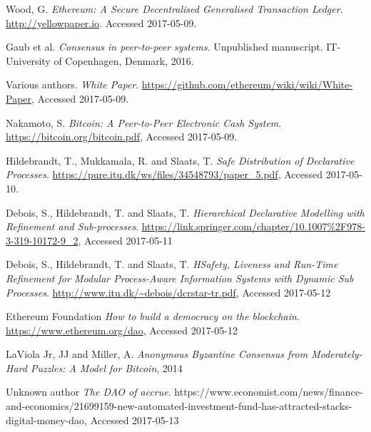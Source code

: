 \documentclass{article}
\begin{document}
	\pagebreak
	
	\begin{thebibliography}{99}

		Wood, G.
		\textit{Ethereum: A Secure Decentralised Generalised Transaction Ledger}. 
		\url{http://yellowpaper.io}.
		Accessed 2017-05-09.

		Gaub et al.
		\textit{Consensus in peer-to-peer systems}.
		Unpublished manuscript.
		IT-University of Copenhagen,
		Denmark,
		2016.

		Various authors.
		\textit{White Paper}.
		\url{https://github.com/ethereum/wiki/wiki/White-Paper},
		Accessed 2017-05-09.

		Nakamoto, S.
		\textit{Bitcoin: A Peer-to-Peer Electronic Cash System}.
		\url{https://bitcoin.org/bitcoin.pdf},
		Accessed 2017-05-09.

		Hildebrandt, T., Mukkamala, R. and Slaats, T.
		\textit{Safe Distribution of Declarative Processes}.
		\url{https://pure.itu.dk/ws/files/34548793/paper_5.pdf},
		Accessed 2017-05-10.

		Debois, S., Hildebrandt, T. and Slaats, T.
		\textit{Hierarchical Declarative Modelling with Refinement and Sub-processes}.
		\url{https://link.springer.com/chapter/10.1007%2F978-3-319-10172-9_2},
		Accessed 2017-05-11

		Debois, S., Hildebrandt, T. and Slaats, T.
		\textit{HSafety, Liveness and Run-Time Refinement for Modular Process-Aware Information Systems with Dynamic Sub Processes}.
		\url{http://www.itu.dk/~debois/dcrstar-tr.pdf},
		Accessed 2017-05-12
		
		Ethereum Foundation
		\textit{How to build a democracy on the blockchain}.
		\url{https://www.ethereum.org/dao},
		Accessed 2017-05-12

		LaViola Jr, JJ and Miller, A.
		\textit{Anonymous Byzantine Consensus from Moderately-Hard Puzzles: A Model for Bitcoin},
		2014

		Unknown author
		\textit{The DAO of accrue}.
		{https://www.economist.com/news/finance-and-economics/21699159-new-automated-investment-fund-has-attracted-stacks-digital-money-dao},
		Accessed 2017-05-13

	\end{thebibliography}
\end{document}
